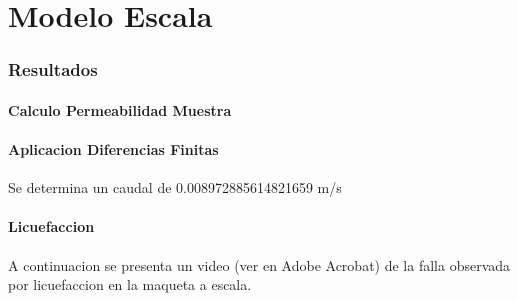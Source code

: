 \part{Modelo Escala}

\section{Resultados}

\subsection{Calculo Permeabilidad Muestra}

\subsection{Aplicacion Diferencias Finitas}

Se determina un caudal de 0.008972885614821659 m/s

\subsection{Licuefaccion}

A continuacion se presenta un video (ver en Adobe Acrobat) de la falla observada por licuefaccion en la maqueta a escala.

\begin{center}
\end{center}
